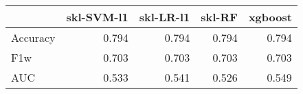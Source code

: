 \begin{tabular}{lrrrr}
\toprule
{} &  skl-SVM-l1 &  skl-LR-l1 &  skl-RF &  xgboost \\
\midrule
Accuracy &       0.794 &      0.794 &   0.794 &    0.794 \\
F1w      &       0.703 &      0.703 &   0.703 &    0.703 \\
AUC      &       0.533 &      0.541 &   0.526 &    0.549 \\
\bottomrule
\end{tabular}
